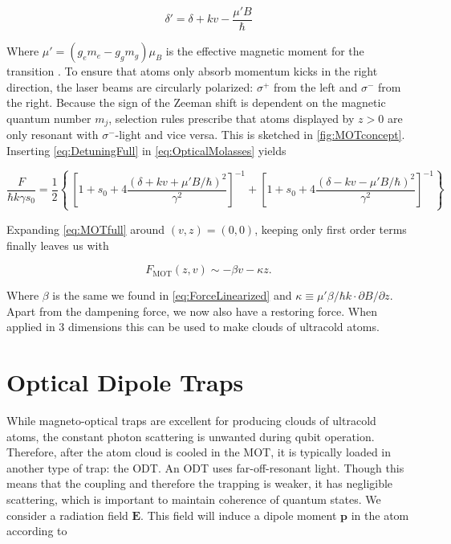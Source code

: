 \begin{equation}\label{eq:DetuningFull}
	\delta' = \delta + k v - \frac{\mu'B}{\hbar}
\end{equation}

Where $\mu' = (g_e m_e-g_g m_g)\mu_B$ is the effective magnetic moment for the transition \cite{Kowalski2010}. To ensure that atoms only absorb momentum kicks in the right direction, the laser beams are circularly polarized: $\sigma^+$ from the left and $\sigma^-$ from the right. Because the sign of the Zeeman shift is dependent on the magnetic quantum number $m_j$, selection rules prescribe that atoms displayed by $z>0$ are only resonant with $\sigma^-$-light and vice versa. This is sketched in \cref{fig:MOTconcept}. Inserting \cref{eq:DetuningFull} in \cref{eq:OpticalMolasses} yields

\begin{equation}\label{eq:MOTfull}
	\frac{F}{\hbar k \gamma s_0} = \frac{1}{2}\left\{\
	\left[1 + s_0 + 4\frac{(\delta+kv+\mu'B/\hbar)^2}{\gamma^2}\right]^{-1}+
	\left[1 + s_0 + 4\frac{(\delta-kv-\mu'B/\hbar)^2}{\gamma^2}\right]^{-1}
	\right\}
\end{equation}

Expanding \cref{eq:MOTfull} around $(v,z) = (0,0)$, keeping only first order terms finally leaves us with \cite{Kowalski2010}

\begin{equation}\label{eq:ForceMOT}
	F_{\text{MOT}}(z,v) \sim -\beta v - \kappa z.
\end{equation}

Where $\beta$ is the same we found in \cref{eq:ForceLinearized} and $\kappa \equiv \mu' \beta /\hbar k \cdot \partial B/\partial z$. Apart from the dampening force, we now also have a restoring force. When applied in 3 dimensions this can be used to make clouds of ultracold atoms. 

\section{Optical Dipole Traps}\label{sec:OpticalDipoleTrap}

While magneto-optical traps are excellent for producing clouds of ultracold atoms, the constant photon scattering is unwanted during qubit operation. Therefore, after the atom cloud is cooled in the \ac{MOT}, it is typically loaded in another type of trap: the \ac{ODT}. An ODT uses far-off-resonant light. Though this means that the coupling and therefore the trapping is weaker, it has negligible scattering, which is important to maintain coherence of quantum states. We consider a radiation field $\mathbf{E}$. This field will induce a dipole moment $\mathbf{p}$ in the atom according to 
	
